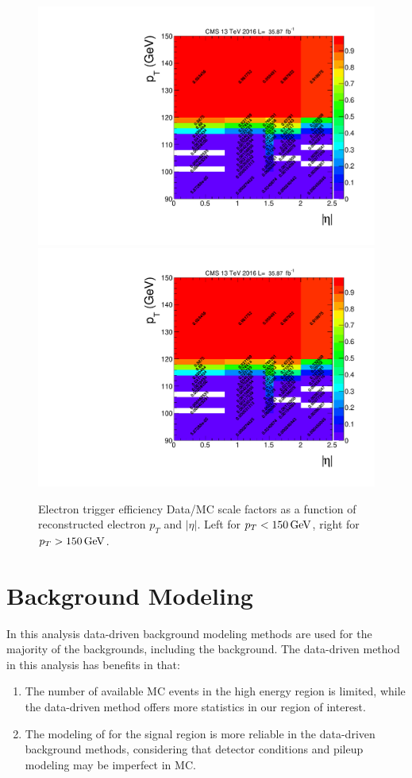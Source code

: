 \begin{figure}[htpb]
\begin{center}
\includegraphics[width=0.49\linewidth, page=5]{figures/hlt115electron_2016fulleff_absetapt.pdf}
\includegraphics[width=0.49\linewidth, page=6]{figures/hlt115electron_2016fulleff_absetapt.pdf}
\caption{Electron trigger efficiency Data/MC scale factors as a function of reconstructed electron $p_T$ and $|\eta|$. Left for $p_T <150\,\text{Ge\hspace{-.08em}V}$, right for $p_T >150\,\text{Ge\hspace{-.08em}V}$. }
\label{fig:trgeff_el_sf}
\end{center}
\end{figure}

\clearpage
\section{\boldmath{\Zjets} Background Modeling}\label{sec:dybk}
In this analysis data-driven background modeling methods are used for the majority of the backgrounds, including the \Zjets background. The data-driven method in this analysis has benefits in that:
\begin{enumerate}
\item The number of available MC events in the high energy region is limited, while the data-driven method offers more statistics in our region of interest.
\item The modeling of \ptmiss for the signal region is more reliable in the data-driven background methods, considering that detector conditions and pileup modeling may be imperfect in MC.
\end{enumerate}

